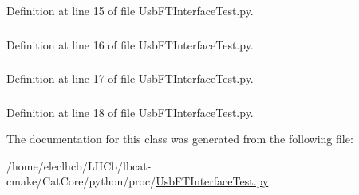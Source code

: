 Definition at line 15 of file UsbFTInterfaceTest.py.\hypertarget{classUsbFTInterfaceTest_1_1UsbFTInterfaceTest_a34e71f256da6e35997a45f6b4b0e323c}{
\subsubsection[{s2}]{}}
\label{classUsbFTInterfaceTest_1_1UsbFTInterfaceTest_a34e71f256da6e35997a45f6b4b0e323c}


Definition at line 16 of file UsbFTInterfaceTest.py.\hypertarget{classUsbFTInterfaceTest_1_1UsbFTInterfaceTest_af3910479f8d5c10f72d5db3aaa344c4f}{
\subsubsection[{s3}]{}}
\label{classUsbFTInterfaceTest_1_1UsbFTInterfaceTest_af3910479f8d5c10f72d5db3aaa344c4f}


Definition at line 17 of file UsbFTInterfaceTest.py.\hypertarget{classUsbFTInterfaceTest_1_1UsbFTInterfaceTest_a06521aa6f0d8367a987bfb04d4605666}{
\subsubsection[{s4}]{}}
\label{classUsbFTInterfaceTest_1_1UsbFTInterfaceTest_a06521aa6f0d8367a987bfb04d4605666}


Definition at line 18 of file UsbFTInterfaceTest.py.

The documentation for this class was generated from the following file:\begin{DoxyCompactItemize}
\item 
/home/eleclhcb/LHCb/lbcat-\/cmake/CatCore/python/proc/\hyperlink{UsbFTInterfaceTest_8py}{UsbFTInterfaceTest.py}\end{DoxyCompactItemize}
